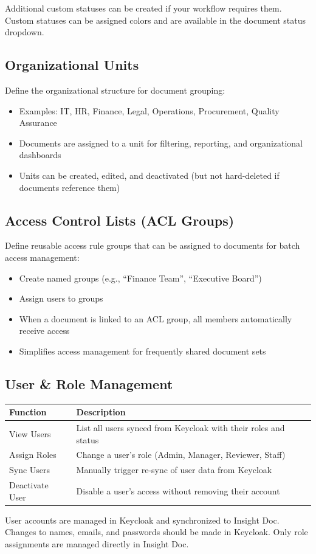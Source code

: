 Additional custom statuses can be created if your workflow
requires them. Custom statuses can be assigned colors and
are available in the document status dropdown.

\subsection{Organizational Units}

Define the organizational structure for document grouping:

\begin{itemize}[leftmargin=18pt]
  \item Examples: IT, HR, Finance, Legal, Operations,
    Procurement, Quality Assurance
  \item Documents are assigned to a unit for filtering,
    reporting, and organizational dashboards
  \item Units can be created, edited, and deactivated
    (but not hard-deleted if documents reference them)
\end{itemize}

\subsection{Access Control Lists (ACL Groups)}

Define reusable access rule groups that can be assigned to
documents for batch access management:

\begin{itemize}[leftmargin=18pt]
  \item Create named groups (e.g., ``Finance Team'',
    ``Executive Board'')
  \item Assign users to groups
  \item When a document is linked to an ACL group, all
    members automatically receive access
  \item Simplifies access management for frequently shared
    document sets
\end{itemize}

\subsection{User \& Role Management}

\begin{tabularx}{\textwidth}{@{} l X @{}}
  \toprule
  \textbf{Function} & \textbf{Description} \\
  \midrule
  View Users
    & List all users synced from Keycloak with their
      roles and status \\
  Assign Roles
    & Change a user's role (Admin, Manager, Reviewer,
      Staff) \\
  Sync Users
    & Manually trigger re-sync of user data from
      Keycloak \\
  Deactivate User
    & Disable a user's access without removing their
      account \\
  \bottomrule
\end{tabularx}

\begin{ugNote}
  User accounts are managed in Keycloak and synchronized
  to Insight Doc. Changes to names, emails, and passwords
  should be made in Keycloak. Only role assignments are
  managed directly in Insight Doc.
\end{ugNote}

\newpage
